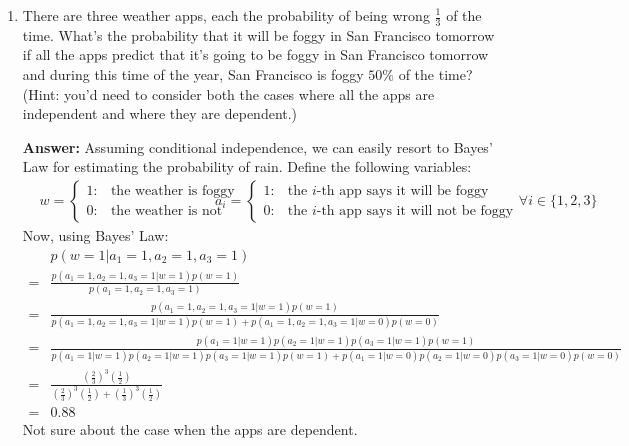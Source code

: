 \documentclass{article}
\newenvironment{QandA}{\begin{enumerate}[label=\arabic*.]}{\end{enumerate}}
\newenvironment{answer}{\par\normalfont \textbf{Answer:}}{}
\newcommand{\g}{\vert}
\begin{document}
\begin{QandA}
    \item There are three weather apps, each the probability of being wrong $\frac{1}{3}$ of the time. What's the probability that it will be foggy in San Francisco tomorrow if all the apps predict that it's going to be foggy in San Francisco tomorrow and during this time of the year, San Francisco is foggy $50\%$ of the time? (Hint: you’d need to consider both the cases where all the apps are independent and where they are dependent.)
    \begin{answer}
        Assuming conditional independence, we can easily resort to Bayes' Law  for estimating the probability of rain. Define the following variables:
        \begin{align*}
            &w = \begin{cases}
                1: &\text{the weather is foggy} \\
                0: &\text{the weather is not foggy}
            \end{cases}
            &a_i = \begin{cases}
                1: &\text{the $i$-th app says it will be foggy} \\
                0: &\text{the $i$-th app says it will not be foggy}
            \end{cases}
            \forall i \in \{1, 2, 3\}
        \end{align*}
        Now, using Bayes' Law:
        \begin{align*}
            &p(w=1 \g a_1 = 1, a_2 = 1, a_3 = 1) \\ = &\frac{p(a_1 = 1, a_2 = 1, a_3 = 1 \g w=1)p(w=1)}{p(a_1 = 1, a_2 = 1, a_3 = 1)} \\
            = &\frac{p(a_1 = 1, a_2 = 1, a_3 = 1 \g w=1)p(w=1)}{p(a_1 = 1, a_2 = 1, a_3 = 1 \g w = 1)p(w=1) + p(a_1 = 1, a_2 = 1, a_3 = 1 \g w = 0)p(w=0)} \\
            = &\frac{p(a_1=1 \g w = 1)p(a_2=1 \g w = 1)p(a_3=1 \g w = 1)p(w=1)}{p(a_1=1 \g w = 1)p(a_2=1 \g w = 1)p(a_3=1 \g w = 1)p(w=1) + p(a_1=1 \g w = 0)p(a_2=1 \g w = 0)p(a_3=1 \g w = 0)p(w=0)} \\
            = &\frac{\left(\frac{2}{3}\right)^3 \left( \frac{1}{2} \right)}{\left(\frac{2}{3}\right)^3 \left( \frac{1}{2} \right) + \left(\frac{1}{3}\right)^3 \left( \frac{1}{2} \right)} \\
            = &0.88
        \end{align*}
        Not sure about the case when the apps are dependent.
        

\end{answer}
\end{QandA}
\end{document}
